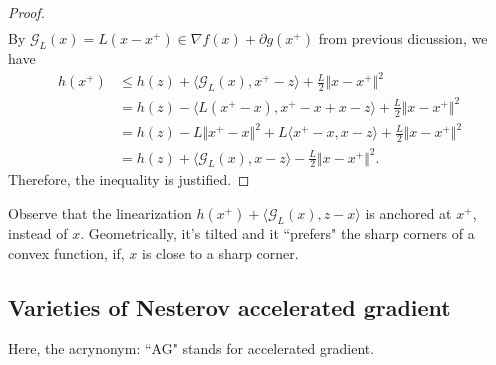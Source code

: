 \begin{proof}
{\begin{align*}
        \end{align*}
        }
        By $\mathcal G_L(x) = L(x - x^+) \in \nabla f(x) + \partial g(x^+)$ from previous dicussion, we have 
        \begin{align*}
            h(x^+) &\le 
            h(z) + \langle \mathcal G_L(x), x^+ - z\rangle + \frac{L}{2}\Vert x - x^+\Vert^2
            \\
            &= h(z) - \langle L(x^+ - x), x^+ - x + x - z \rangle 
            + 
            \frac{L}{2}\Vert x - x^+\Vert^2
            \\
            &= 
            h(z) - L\Vert x^+ - x\Vert^2 
            + L \langle x^+ - x, x - z\rangle
            + \frac{L}{2}\Vert x - x^+\Vert^2
            \\
            &= h(z) + \langle \mathcal G_L(x), x - z\rangle - 
            \frac{L}{2}\Vert x - x^+\Vert^2. 
        \end{align*}
        Therefore, the inequality is justified. 
    \end{proof}
    \begin{remark}
        Observe that the linearization $h(x^+) + \langle \mathcal G_L(x), z - x\rangle$ is anchored at $x^+$, instead of $x$. 
        Geometrically, it's tilted and it ``prefers" the sharp corners of a convex function, if, $x$ is close to a sharp corner. 
    \end{remark}

\subsection{Varieties of Nesterov accelerated gradient}\label{sec:AG_varieties}
    Here, the acrynonym: ``AG" stands for accelerated gradient. 
